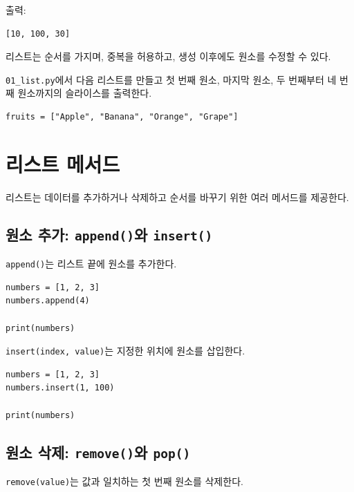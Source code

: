 \documentclass[11pt,a4paper]{article}
\begin{document}
출력:

\begin{verbatim}
[10, 100, 30]
\end{verbatim}

\begin{importantbox}
리스트는 순서를 가지며, 중복을 허용하고, 생성 이후에도 원소를 수정할 수 있다.
\end{importantbox}

\begin{practicebox}
\texttt{01\_list.py}에서 다음 리스트를 만들고 첫 번째 원소, 마지막 원소, 두 번째부터 네 번째 원소까지의 슬라이스를 출력한다.
\begin{lstlisting}
fruits = ["Apple", "Banana", "Orange", "Grape"]
\end{lstlisting}
\end{practicebox}

\section{리스트 메서드}

리스트는 데이터를 추가하거나 삭제하고 순서를 바꾸기 위한 여러 메서드를 제공한다.

\subsection{원소 추가: \texttt{append()}와 \texttt{insert()}}

\texttt{append()}는 리스트 끝에 원소를 추가한다.

\begin{lstlisting}
numbers = [1, 2, 3]
numbers.append(4)

print(numbers)
\end{lstlisting}

\texttt{insert(index, value)}는 지정한 위치에 원소를 삽입한다.

\begin{lstlisting}
numbers = [1, 2, 3]
numbers.insert(1, 100)

print(numbers)
\end{lstlisting}

\subsection{원소 삭제: \texttt{remove()}와 \texttt{pop()}}

\texttt{remove(value)}는 값과 일치하는 첫 번째 원소를 삭제한다.
\end{document}
